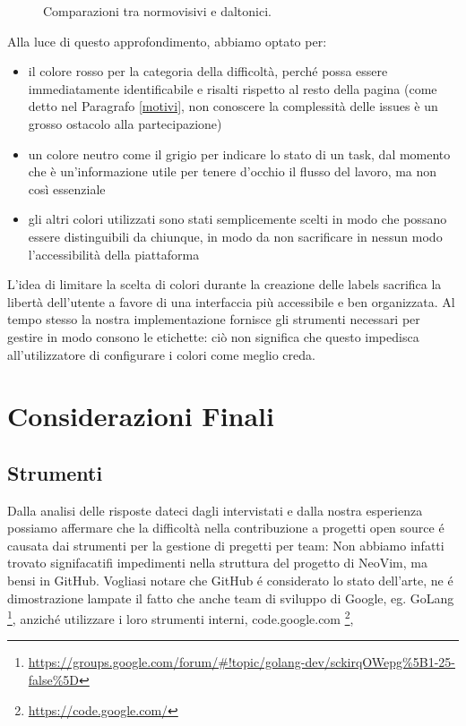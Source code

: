 \documentclass[12pt]{article} %
\begin{document}
\begin{figure}[H] 
\caption{Comparazioni tra normovisivi e daltonici.}
\label{fig:daltonici}
\end{figure}

Alla luce di questo approfondimento, abbiamo optato per:
\begin{itemize}
\item il colore rosso per la categoria della difficoltà, perché possa essere immediatamente identificabile e risalti rispetto al resto della pagina (come detto nel Paragrafo \ref{motivi}, non conoscere la complessità delle issues è un grosso ostacolo alla partecipazione)
\item un colore neutro come il grigio per indicare lo stato di un task, dal momento che è un'informazione utile per tenere d'occhio il flusso del lavoro, ma non così essenziale
\item gli altri colori utilizzati sono stati semplicemente scelti in modo che possano essere distinguibili da chiunque, in modo da non sacrificare in nessun modo l'accessibilità della piattaforma 
\end{itemize}
L'idea di limitare la scelta di colori durante la creazione delle labels sacrifica la libertà dell'utente a favore di una interfaccia più accessibile e ben organizzata. Al tempo stesso la nostra implementazione fornisce gli strumenti necessari per gestire in modo consono le etichette: ciò non significa che questo impedisca all'utilizzatore di configurare i colori come meglio creda.

\newpage
\section{Considerazioni Finali}

\subsection{Strumenti}
Dalla analisi delle risposte dateci dagli intervistati e dalla nostra esperienza possiamo affermare che la difficolt\`a nella contribuzione a progetti open source \'e causata dai strumenti per la gestione di pregetti per team:
Non abbiamo infatti trovato signifacatifi impedimenti nella struttura del progetto di NeoVim, ma bensi in GitHub.
Vogliasi notare che GitHub \'e considerato lo stato dell'arte, ne \'e dimostrazione lampate il fatto che anche team di sviluppo di Google, eg. GoLang \footnote{\url{https://groups.google.com/forum/#!topic/golang-dev/sckirqOWepg\%5B1-25-false\%5D}}, anzich\'e utilizzare i loro strumenti interni, code.google.com \footnote{\url{https://code.google.com/}}, 



\cite{*}

\newpage


\end{document}
